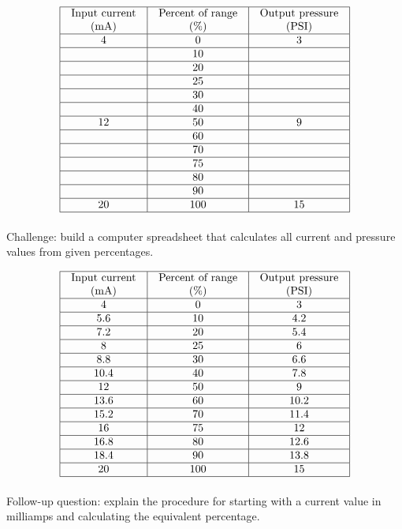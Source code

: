 $$\vbox{\offinterlineskip
\halign{\strut
\vrule \quad\hfil # \ \hfil & 
\vrule \quad\hfil # \ \hfil & 
\vrule \quad\hfil # \ \hfil \vrule \cr
\noalign{\hrule}
%
Input current & Percent of range & Output pressure \cr
%
(mA) & (\%) & (PSI) \cr
%
\noalign{\hrule}
%
4 & 0 & 3 \cr
%
\noalign{\hrule}
%
 & 10 &  \cr
%
\noalign{\hrule}
%
 & 20 &  \cr
%
\noalign{\hrule}
%
 & 25 &  \cr
%
\noalign{\hrule}
%
 & 30 &  \cr
%
\noalign{\hrule}
%
 & 40 &  \cr
%
\noalign{\hrule}
%
12 & 50 & 9 \cr
%
\noalign{\hrule}
%
 & 60 &  \cr
%
\noalign{\hrule}
%
 & 70 &  \cr
%
\noalign{\hrule}
%
 & 75 &  \cr
%
\noalign{\hrule}
%
 & 80 &  \cr
%
\noalign{\hrule}
%
 & 90 &  \cr
%
\noalign{\hrule}
%
20 & 100 & 15 \cr
%
\noalign{\hrule}
} %
}$$ %

Challenge: build a computer spreadsheet that calculates all current and pressure values from given percentages.







$$\vbox{\offinterlineskip
\halign{\strut
\vrule \quad\hfil # \ \hfil & 
\vrule \quad\hfil # \ \hfil & 
\vrule \quad\hfil # \ \hfil \vrule \cr
\noalign{\hrule}
%
Input current & Percent of range & Output pressure \cr
%
(mA) & (\%) & (PSI) \cr
%
\noalign{\hrule}
%
4 & 0 & 3 \cr
%
\noalign{\hrule}
%
5.6 & 10 & 4.2 \cr
%
\noalign{\hrule}
%
7.2 & 20 & 5.4 \cr
%
\noalign{\hrule}
%
8 & 25 & 6 \cr
%
\noalign{\hrule}
%
8.8 & 30 & 6.6 \cr
%
\noalign{\hrule}
%
10.4 & 40 & 7.8 \cr
%
\noalign{\hrule}
%
12 & 50 & 9 \cr
%
\noalign{\hrule}
%
13.6 & 60 & 10.2 \cr
%
\noalign{\hrule}
%
15.2 & 70 & 11.4 \cr
%
\noalign{\hrule}
%
16 & 75 & 12 \cr
%
\noalign{\hrule}
%
16.8 & 80 & 12.6 \cr
%
\noalign{\hrule}
%
18.4 & 90 & 13.8 \cr
%
\noalign{\hrule}
%
20 & 100 & 15 \cr
%
\noalign{\hrule}
} %
}$$ %

\vskip 10pt

Follow-up question: explain the procedure for starting with a current value in milliamps and calculating the equivalent percentage.

